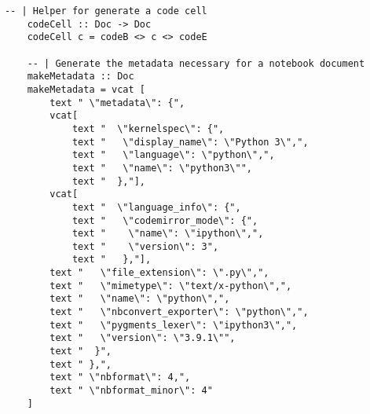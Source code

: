 \begin{lstlisting}[language=haskell1, 
	basicstyle=\linespread{1.1}\small\ttfamily]
	-- | Helper for generate a code cell
	codeCell :: Doc -> Doc
	codeCell c = codeB <> c <> codeE
		
	-- | Generate the metadata necessary for a notebook document
	makeMetadata :: Doc  
	makeMetadata = vcat [
		text " \"metadata\": {", 
		vcat[
			text "  \"kernelspec\": {", 
			text "   \"display_name\": \"Python 3\",", 
			text "   \"language\": \"python\",",
			text "   \"name\": \"python3\"", 
			text "  },"],
		vcat[
			text "  \"language_info\": {", 
			text "   \"codemirror_mode\": {", 
			text "    \"name\": \"ipython\",",
			text "    \"version\": 3",
			text "   },"],
		text "   \"file_extension\": \".py\",", 
		text "   \"mimetype\": \"text/x-python\",",
		text "   \"name\": \"python\",",
		text "   \"nbconvert_exporter\": \"python\",",
		text "   \"pygments_lexer\": \"ipython3\",",
		text "   \"version\": \"3.9.1\"",
		text "  }",
		text " },",
		text " \"nbformat\": 4,", 
		text " \"nbformat_minor\": 4" 
	]
\end{lstlisting}

